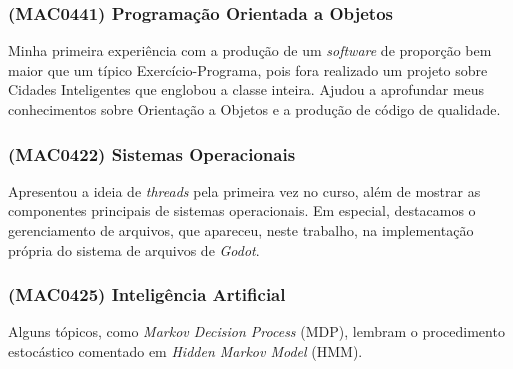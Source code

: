 \subsubsection{(MAC0441) Programação Orientada a Objetos}

Minha primeira experiência com a produção de um \textit{software} de proporção bem maior que um típico Exercício-Programa, pois fora realizado um projeto sobre Cidades Inteligentes que englobou a classe inteira. Ajudou a aprofundar meus conhecimentos sobre Orientação a Objetos e a produção de código de qualidade.

\subsubsection{(MAC0422) Sistemas Operacionais}

Apresentou a ideia de \textit{threads} pela primeira vez no curso, além de mostrar as componentes principais de sistemas operacionais. Em especial, destacamos o gerenciamento de arquivos, que apareceu, neste trabalho, na implementação própria do sistema de arquivos de \textit{Godot}.

\subsubsection{(MAC0425) Inteligência Artificial}

Alguns tópicos, como \textit{Markov Decision Process} (MDP), lembram o procedimento estocástico comentado em \textit{Hidden Markov Model} (HMM).
